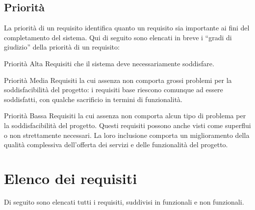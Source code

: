 \subsection{Priorità}
\label{subsec:priorita}

La priorità di un requisito identifica quanto un requisito sia importante ai fini del completamento del sistema.
Qui di seguito sono elencati in breve i ``gradi di giudizio'' della priorità di un requisito:
\begin{descriptionInd}
	\item[Priorità Alta] Requisiti che il sistema deve necessariamente soddisfare.

	\item[Priorità Media] Requisiti la cui assenza non comporta grossi problemi per la soddisfacibilità del progetto: i requisiti base riescono comunque ad essere soddisfatti, con qualche sacrificio in termini di funzionalità. 

	\item[Priorità Bassa] Requisiti la cui assenza non comporta alcun tipo di problema per la soddisfacibilità del progetto. Questi requisiti possono anche visti come superflui o non strettamente necessari. La loro inclusione comporta un miglioramento della qualità complessiva dell’offerta dei servizi e delle funzionalità del progetto.
\end{descriptionInd}

\newpage
\section{Elenco dei requisiti}
\label{sec:elenco_dei_requisiti}
Di seguito sono elencati tutti i requisiti, suddivisi in funzionali e non funzionali.

